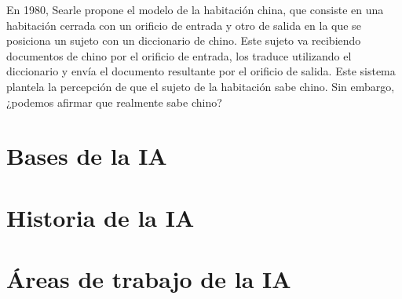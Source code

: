 En 1980, Searle propone el modelo de la habitación china, que consiste en una habitación cerrada con un orificio de entrada y otro de salida en la que se posiciona un sujeto con un diccionario de chino.
Este sujeto va recibiendo documentos de chino por el orificio de entrada, los traduce utilizando el diccionario y envía el documento resultante por el orificio de salida.
Este sistema plantela la percepción de que el sujeto de la habitación sabe chino.
Sin embargo, ¿podemos afirmar que realmente sabe chino?

\section{Bases de la IA}

\section{Historia de la IA}

\section{Áreas de trabajo de la IA}
